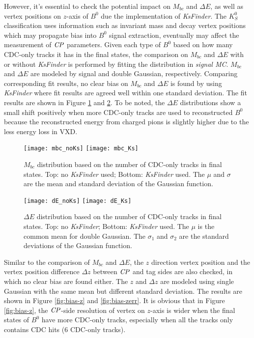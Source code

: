  However, it's essential to check the potential impact on $M_{bc}$ and $\Delta E$, as well as vertex positions on $z$-axis of $B^0$ due the implementation of \textit{KsFinder}. The $K_S^0$ classification uses information such as invariant mass and decay vertex positions which may propagate bias into $B^0$ signal extraction, eventually may affect the measurement of $\it{CP}$ parameters. Given each type of $B^0$ based on how many CDC-only tracks it has in the final states, the comparison on $M_{bc}$ and $\Delta{E}$ with or without \textit{KsFinder} is performed by fitting the distribution in \textit{signal MC}. $M_{bc}$ and $\Delta{E}$ are modeled by signal and double Gaussian, respectively. Comparing corresponding fit results, no clear bias on $M_{bc}$ and $\Delta{E}$ is found by using \textit{KsFinder} where fit results are agreed well within one standard deviation. The fit results are shown in Figure \ref{fig:mbc_bias} and \ref{fig:de_bias}. To be noted, the $\Delta E$ distributions show a small shift positively when more CDC-only tracks are used to reconstructed $B^0$ because the reconstructed energy from charged pions is slightly higher due to the less energy loss in VXD.
 
 \begin{figure}[htpb]
 	\centering
 	\texttt{[image: mbc\_noKs]}
 	\texttt{[image: mbc\_Ks]}
 	\caption{$M_{bc}$ distribution based on the number of CDC-only tracks in final states. Top: no \textit{KsFinder} used; Bottom: \textit{KsFinder} used. The $\mu$ and $\sigma$ are the mean and standard deviation of the Gaussian function.}
 	\label{fig:mbc_bias}
 \end{figure}
 \begin{figure}[htpb]
	\centering
	\texttt{[image: dE\_noKs]}
	\texttt{[image: dE\_Ks]}
	\caption{$\Delta{E}$ distribution based on the number of CDC-only tracks in final states. Top: no \textit{KsFinder}; Bottom: \textit{KsFinder} used. The $\mu$ is the common mean for double Gaussian. The $\sigma_1$ and $\sigma_2$ are the standard deviations of the Gaussian function.}
	\label{fig:de_bias}
\end{figure}

Similar to the comparison of $M_{bc}$ and $\Delta{E}$, the $z$ direction vertex position and the vertex position difference $\Delta z$ between $\it{CP}$ and tag sides are also checked, in which no clear bias are found either. The $z$ and $\Delta z$ are modeled using single Gaussian with the same mean but different standard deviation. The results are shown in Figure \ref{fig:bias-z} and \ref{fig:bias-zerr}. It is obvious that in Figure \ref{fig:bias-z}, the $\it{CP}$-side resolution of vertex on $z$-axis is wider when the final states of $B^0$ have more CDC-only tracks, especially when all the tracks only contains CDC hits (6 CDC-only tracks).

